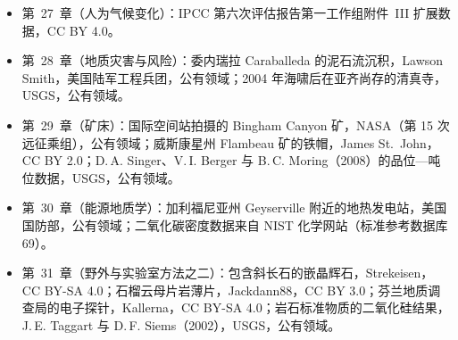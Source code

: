 \begin{itemize}
  \item 第~27~章（人为气候变化）：IPCC 第六次评估报告第一工作组附件~III 扩展数据，CC BY 4.0。
  \item 第~28~章（地质灾害与风险）：委内瑞拉 Caraballeda 的泥石流沉积，Lawson Smith，美国陆军工程兵团，公有领域；2004 年海啸后在亚齐尚存的清真寺，USGS，公有领域。
  \item 第~29~章（矿床）：国际空间站拍摄的 Bingham Canyon 矿，NASA（第 15 次远征乘组），公有领域；威斯康星州 Flambeau 矿的铁帽，James St.~John，CC BY 2.0；D.\,A. Singer、V.\,I. Berger 与 B.\,C. Moring（2008）的品位—吨位数据，USGS，公有领域。
  \item 第~30~章（能源地质学）：加利福尼亚州 Geyserville 附近的地热发电站，美国国防部，公有领域；二氧化碳密度数据来自 NIST 化学网站（标准参考数据库 69）。
  \item 第~31~章（野外与实验室方法之二）：包含斜长石的嵌晶辉石，Strekeisen，CC BY-SA 4.0；石榴云母片岩薄片，Jackdann88，CC BY 3.0；芬兰地质调查局的电子探针，Kallerna，CC BY-SA 4.0；岩石标准物质的二氧化硅结果，J.\,E. Taggart 与 D.\,F. Siems（2002），USGS，公有领域。
\end{itemize}
